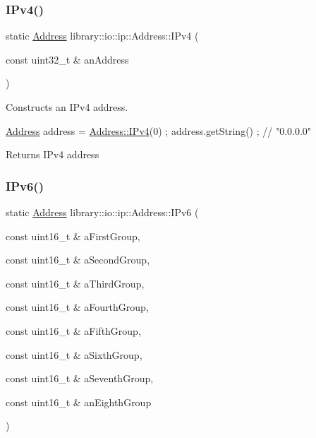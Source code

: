 \subsubsection{\texorpdfstring{I\+Pv4()}{IPv4()}\hspace{0.1cm}{\footnotesize\ttfamily [2/2]}}
{\footnotesize\ttfamily static \hyperlink{classlibrary_1_1io_1_1ip_1_1_address}{Address} library\+::io\+::ip\+::\+Address\+::\+I\+Pv4 (\begin{DoxyParamCaption}\item[{const uint32\+\_\+t \&}]{an\+Address }\end{DoxyParamCaption})\hspace{0.3cm}{\ttfamily [static]}}



Constructs an I\+Pv4 address. 


\begin{DoxyCode}
\hyperlink{classlibrary_1_1io_1_1ip_1_1_address_ab968d468b8bc2ba8f48fd2b6784832fe}{Address} address = \hyperlink{classlibrary_1_1io_1_1ip_1_1_address_a046ddcc0011c0301e2d52f2aaf2e4bca}{Address::IPv4}(0) ;
address.getString() ; \textcolor{comment}{// "0.0.0.0"}
\end{DoxyCode}


\begin{DoxyReturn}{Returns}
I\+Pv4 address 
\end{DoxyReturn}
\mbox{\label{classlibrary_1_1io_1_1ip_1_1_address_aa89db4931003a16ebfaea376308164ab}} 
\subsubsection{\texorpdfstring{I\+Pv6()}{IPv6()}}
{\footnotesize\ttfamily static \hyperlink{classlibrary_1_1io_1_1ip_1_1_address}{Address} library\+::io\+::ip\+::\+Address\+::\+I\+Pv6 (\begin{DoxyParamCaption}\item[{const uint16\+\_\+t \&}]{a\+First\+Group,  }\item[{const uint16\+\_\+t \&}]{a\+Second\+Group,  }\item[{const uint16\+\_\+t \&}]{a\+Third\+Group,  }\item[{const uint16\+\_\+t \&}]{a\+Fourth\+Group,  }\item[{const uint16\+\_\+t \&}]{a\+Fifth\+Group,  }\item[{const uint16\+\_\+t \&}]{a\+Sixth\+Group,  }\item[{const uint16\+\_\+t \&}]{a\+Seventh\+Group,  }\item[{const uint16\+\_\+t \&}]{an\+Eighth\+Group }\end{DoxyParamCaption})\hspace{0.3cm}{\ttfamily [static]}}



